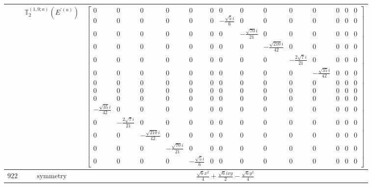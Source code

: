 \documentclass[fleqn,8pt,landscape]{jsarticle}
\begin{document}
\begin{longtable}{ccc}
$  $ & $ \mathbb{T}_{2}^{(1,0;a)}(E^{\prime(a)}) $ & $ \begin{bmatrix} 0 & 0 & 0 & 0 & 0 & 0 & 0 & 0 & 0 & 0 & 0 & 0 & 0 & 0 \\ 0 & 0 & 0 & 0 & 0 & 0 & - \frac{\sqrt{5} i}{6} & 0 & 0 & 0 & 0 & 0 & 0 & 0 \\ 0 & 0 & 0 & 0 & 0 & 0 & 0 & - \frac{\sqrt{70} i}{21} & 0 & 0 & 0 & 0 & 0 & 0 \\ 0 & 0 & 0 & 0 & 0 & 0 & 0 & 0 & - \frac{\sqrt{210} i}{42} & 0 & 0 & 0 & 0 & 0 \\ 0 & 0 & 0 & 0 & 0 & 0 & 0 & 0 & 0 & - \frac{2 \sqrt{7} i}{21} & 0 & 0 & 0 & 0 \\ 0 & 0 & 0 & 0 & 0 & 0 & 0 & 0 & 0 & 0 & - \frac{\sqrt{35} i}{42} & 0 & 0 & 0 \\ 0 & 0 & 0 & 0 & 0 & 0 & 0 & 0 & 0 & 0 & 0 & 0 & 0 & 0 \\ 0 & 0 & 0 & 0 & 0 & 0 & 0 & 0 & 0 & 0 & 0 & 0 & 0 & 0 \\ 0 & 0 & 0 & 0 & 0 & 0 & 0 & 0 & 0 & 0 & 0 & 0 & 0 & 0 \\ - \frac{\sqrt{35} i}{42} & 0 & 0 & 0 & 0 & 0 & 0 & 0 & 0 & 0 & 0 & 0 & 0 & 0 \\ 0 & - \frac{2 \sqrt{7} i}{21} & 0 & 0 & 0 & 0 & 0 & 0 & 0 & 0 & 0 & 0 & 0 & 0 \\ 0 & 0 & - \frac{\sqrt{210} i}{42} & 0 & 0 & 0 & 0 & 0 & 0 & 0 & 0 & 0 & 0 & 0 \\ 0 & 0 & 0 & - \frac{\sqrt{70} i}{21} & 0 & 0 & 0 & 0 & 0 & 0 & 0 & 0 & 0 & 0 \\ 0 & 0 & 0 & 0 & - \frac{\sqrt{5} i}{6} & 0 & 0 & 0 & 0 & 0 & 0 & 0 & 0 & 0 \end{bmatrix} $ \\ \hline
$ 922 $ & $ \text{symmetry} $ & $ \frac{\sqrt{6} x^{2}}{4} + \frac{\sqrt{6} i x y}{2} - \frac{\sqrt{6} y^{2}}{4} $ \\

\end{longtable}
\end{document}
